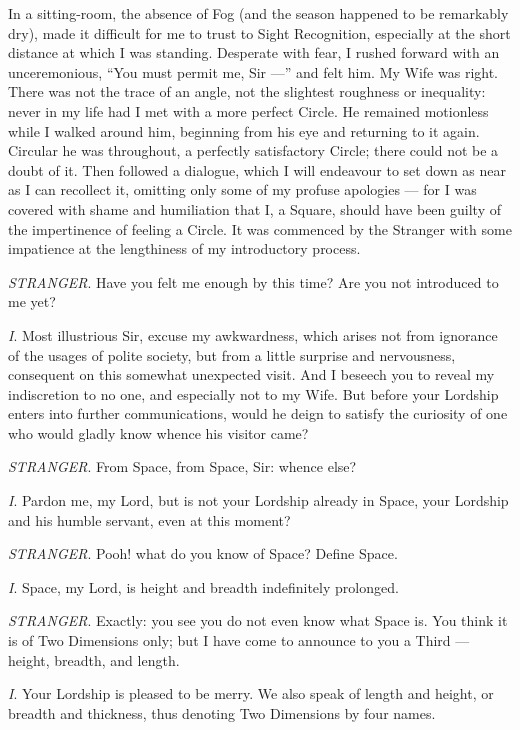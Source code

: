 \documentclass[10pt, kindle, oneside]{kindle}
\begin{document}
In a sitting-room, the absence of Fog (and the season happened to be
remarkably dry), made it difficult for me to trust to Sight Recognition,
especially at the short distance at which I was standing. Desperate with fear,
I rushed forward with an unceremonious, ``You must permit me, Sir ---'' and felt
him. My Wife was right. There was not the trace of an angle, not the slightest
roughness or inequality: never in my life had I met with a more perfect
Circle. He remained motionless while I walked around him, beginning from his
eye and returning to it again. Circular he was throughout, a perfectly
satisfactory Circle; there could not be a doubt of it. Then followed a
dialogue, which I will endeavour to set down as near as I can recollect it,
omitting only some of my profuse apologies --- for I was covered with shame and
humiliation that I, a Square, should have been guilty of the impertinence of
feeling a Circle. It was commenced by the Stranger with some impatience at the
lengthiness of my introductory process.

\emph{STRANGER}. Have you felt me enough by this time? Are you not introduced to me
yet?

\emph{I}. Most illustrious Sir, excuse my awkwardness, which arises not from
ignorance of the usages of polite society, but from a little surprise and
nervousness, consequent on this somewhat unexpected visit. And I beseech you
to reveal my indiscretion to no one, and especially not to my Wife. But before
your Lordship enters into further communications, would he deign to satisfy
the curiosity of one who would gladly know whence his visitor came?

\emph{STRANGER}. From Space, from Space, Sir: whence else?

\emph{I}. Pardon me, my Lord, but is not your Lordship already in Space, your
Lordship and his humble servant, even at this moment?

\emph{STRANGER}. Pooh! what do you know of Space? Define Space.

\emph{I}. Space, my Lord, is height and breadth indefinitely prolonged.

\emph{STRANGER}. Exactly: you see you do not even know what Space is. You think it is
of Two Dimensions only; but I have come to announce to you a Third --- height,
breadth, and length.

\emph{I}. Your Lordship is pleased to be merry. We also speak of length and height,
or breadth and thickness, thus denoting Two Dimensions by four names.
\end{document}
